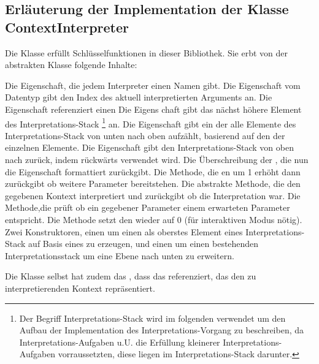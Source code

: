 \subsection{Erläuterung der Implementation der Klasse ContextInterpreter}\label{subsec:ContextInterpreter}
Die Klasse  erfüllt Schlüsselfunktionen in dieser Bibliothek.
Sie erbt von der abstrakten  Klasse folgende Inhalte:
\begin{outline}
 \1 Die  Eigenschaft, die jedem Interpreter einen Namen gibt.
 \1 Die  Eigenschaft vom Datentyp  gibt den Index des aktuell interpretierten Arguments an.
 \1 Die  Eigenschaft referenziert einen 
 \1 Die  Eigens chaft gibt das nächst höhere Element des Interpretations-Stack
 \footnote{Der Begriff Interpretations-Stack wird im folgenden verwendet um den Aufbau der Implementation des Interpretations-Vorgang zu beschreiben, da Interpretations-Aufgaben u.U. die Erfüllung kleinerer Interpretations-Aufgaben vorraussetzten, diese liegen im Interpretations-Stack darunter.}
 an.%
 \1 Die  Eigenschaft gibt ein  der alle Elemente des Interpretations-Stack von unten nach oben aufzählt, basierend auf den  der einzelnen Elemente.
 \1 Die  Eigenschaft gibt den Interpretations-Stack von oben nach zurück, indem  rückwärts verwendet wird.
 \1 Die Überschreibung der , die nun die  Eigenschaft formattiert zurückgibt.
 \1 Die  Methode, die en  um 1 erhöht dann zurückgibt ob weitere Parameter bereitstehen.
 \1 Die abstrakte  Methode, die den gegebenen Kontext interpretiert und zurückgibt ob die Interpretation war.
 \1 Die  Methode,die prüft ob ein gegebener Parameter einem erwarteten Parameter entspricht.
 \1 Die  Methode setzt den  wieder auf 0 (für interaktiven Modus nötig).
 \1 Zwei Konstruktoren, einen um einen  als oberstes Element eines Interpretations-Stack auf Basis eines  zu erzeugen, und einen um einen bestehenden Interpretationsstack um eine Ebene nach unten zu erweitern.
\end{outline}
Die  Klasse selbst hat zudem das , dass das  referenziert, das den zu interpretierenden Kontext repräsentiert.
